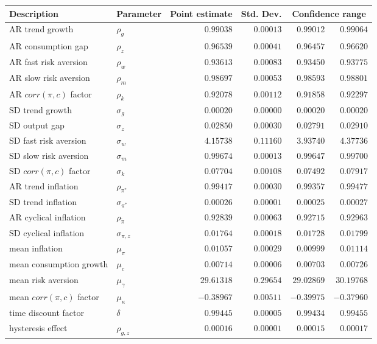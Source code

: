 \begin{tabular}{llrrrr} \hline Description & Parameter & Point estimate & Std. Dev. & \multicolumn{2}{c}{Confidence range} \\ \hline AR trend growth & $\rho_g$ & $0.99038$ & $0.00013$ & $0.99012$ & $0.99064$ \\ AR consumption gap & $\rho_z$ & $0.96539$ & $0.00041$ & $0.96457$ & $0.96620$ \\ AR fast risk aversion & $\rho_w$ & $0.93613$ & $0.00083$ & $0.93450$ & $0.93775$ \\ AR slow risk aversion & $\rho_m$ & $0.98697$ & $0.00053$ & $0.98593$ & $0.98801$ \\ AR $corr(\pi,c)$ factor & $\rho_k$ & $0.92078$ & $0.00112$ & $0.91858$ & $0.92297$ \\ SD trend growth & $\sigma_g$ & $0.00020$ & $0.00000$ & $0.00020$ & $0.00020$ \\ SD output gap & $\sigma_z$ & $0.02850$ & $0.00030$ & $0.02791$ & $0.02910$ \\ SD fast risk aversion & $\sigma_w$ & $4.15738$ & $0.11160$ & $3.93740$ & $4.37736$ \\ SD slow risk aversion & $\sigma_m$ & $0.99674$ & $0.00013$ & $0.99647$ & $0.99700$ \\ SD $corr(\pi,c)$ factor & $\sigma_k$ & $0.07704$ & $0.00108$ & $0.07492$ & $0.07917$ \\ AR trend inflation & $\rho_{\pi^*}$ & $0.99417$ & $0.00030$ & $0.99357$ & $0.99477$ \\ SD trend inflation & $\sigma_{\pi^*}$ & $0.00026$ & $0.00001$ & $0.00025$ & $0.00027$ \\ AR cyclical inflation & $\rho_{\tilde{\pi}}$ & $0.92839$ & $0.00063$ & $0.92715$ & $0.92963$ \\ SD cyclical inflation & $\sigma_{\pi,z}$ & $0.01764$ & $0.00018$ & $0.01728$ & $0.01799$ \\ mean inflation & $\mu_\pi$ & $0.01057$ & $0.00029$ & $0.00999$ & $0.01114$ \\ mean consumption growth & $\mu_c$ & $0.00714$ & $0.00006$ & $0.00703$ & $0.00726$ \\ mean risk aversion & $\mu_\gamma$ & $29.61318$ & $0.29654$ & $29.02869$ & $30.19768$ \\ mean $corr(\pi,c)$ factor & $\mu_\kappa$ & $-0.38967$ & $0.00511$ & $-0.39975$ & $-0.37960$ \\ time discount factor & $\delta$ & $0.99445$ & $0.00005$ & $0.99434$ & $0.99455$ \\ hysteresis effect & $\rho_{g,z}$ & $0.00016$ & $0.00001$ & $0.00015$ & $0.00017$ \\  \hline  \end{tabular}